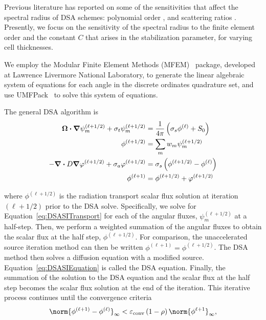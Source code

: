 \documentclass[12pt]{article}
\begin{document}
{Previous literature has reported on some of the sensitivities that affect the spectral radius of DSA schemes: 
polynomial order \cite{WangRagusaDSA, WoodsDSA}, and scattering ratios \cite{WangRagusaDSA, WoodsDSA, WareingDSADFEM}. Presently, we focus on the sensitivity of the spectral radius to the finite element order and the constant $C$ that arises in the stabilization parameter, for varying cell thicknesses.

We employ the Modular Finite Element Methods (MFEM)~\cite{MFEM_Web} package, developed at Lawrence Livermore National Laboratory, to generate the linear algebraic system of equations for each angle in the discrete ordinates quadrature set, and use UMFPack~\cite{DavisUMFPack} to solve this system of equations.
}

The general DSA algorithm is
\begin{subequations}
\begin{flalign}
\bm{\Omega} \bm{\cdot} \bm{\nabla} \psi_m^{(\ell+1/2)} + \sigma_t \psi_m^{(\ell+1/2)} & = \frac{1}{4 \pi} \left(\sigma_s \phi^{(\ell)} + S_0 \right) \label{eq:DSASITransport} \\
\phi^{(\ell+1/2)} & = \sum_m w_m \psi_m^{(\ell+1/2)} \label{eq:DSASIPhiHalf} \\
-\bm{\nabla} \bm{\cdot} D \bm{\nabla} \varphi^{(\ell+1/2)} + \sigma_a \varphi^{(\ell+1/2)} & = \sigma_s \left(\phi^{(\ell+1/2)} - \phi^{(\ell)} \right) \label{eq:DSASIEquation} \\
\phi^{(\ell+1)} & = \phi^{(\ell+1/2)} + \varphi^{(\ell+1/2)} \label{eq:DSASIPhiEnd}
\end{flalign}
\end{subequations}

\noindent where $\phi^{(\ell+1/2)}$ is the radiation transport scalar flux solution at iteration $(\ell+1/2)$ prior to the DSA solve. Specifically, we solve for Equation~\ref{eq:DSASITransport} for each of the angular fluxes, $\psi^{(\ell+1/2)}_m$ at a half-step. Then, we perform a weighted summation of the angular fluxes to obtain the scalar flux at the half step, $\phi^{(\ell+1/2)}$. For comparison, the unaccelerated source iteration method can then be written $\phi^{(\ell+1)} = \phi^{(\ell+1/2)}$. The DSA method then solves a diffusion equation with a modified source. Equation~\ref{eq:DSASIEquation} is called the DSA equation. Finally, the summation of the solution to the DSA equation and the scalar flux at the half step becomes the scalar flux solution at the end of the iteration. This iterative process continues until the convergence criteria
\begin{equation}
\norm{\phi^{\left(\ell+1 \right)} - \phi^{\left(\ell \right)}}_\infty < \varepsilon_\text{conv} \left(1 - \rho \right) \norm{\phi^{\ell+1}}_\infty,
\label{eq:ModifiedConvergenceCriteria}
\end{equation}
\end{document}
